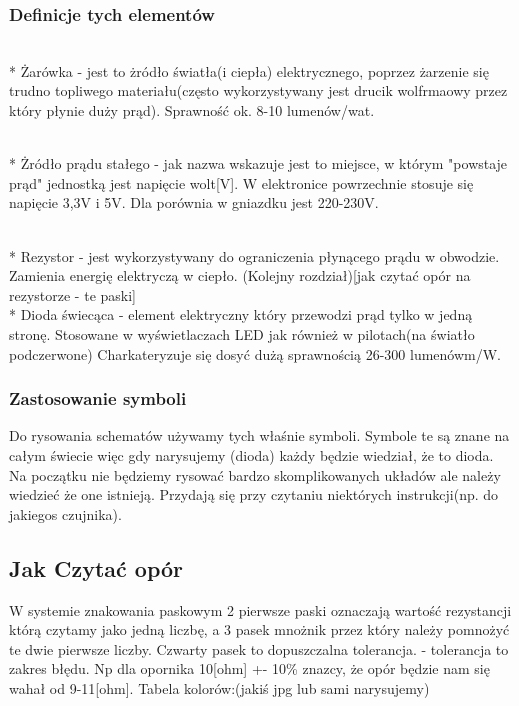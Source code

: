    \subsubsection{Definicje tych elementów}
\\* Żarówka - jest to żródło światła(i ciepła) elektrycznego, poprzez żarzenie się trudno topliwego materiału(często wykorzystywany jest drucik wolfrmaowy przez który płynie duży prąd). Sprawność ok.
8-10 lumenów/wat. 

\\* Żródło prądu stałego - jak nazwa wskazuje jest to miejsce, w którym "powstaje prąd" jednostką jest napięcie wolt[V]. W elektronice powrzechnie stosuje się napięcie 3,3V i 5V. Dla porównia w gniazdku jest 220-230V.

\\* Rezystor - jest wykorzystywany do ograniczenia płynącego prądu w obwodzie. Zamienia energię elektryczą w ciepło. (Kolejny rozdział)[jak czytać opór na rezystorze - te paski]
\\* Dioda świecąca - element elektryczny który przewodzi prąd tylko w jedną stronę. Stosowane w wyświetlaczach LED jak również w pilotach(na światło podczerwone) Charkateryzuje się dosyć dużą sprawnością 26-300 lumenówm/W. 

\subsubsection{Zastosowanie symboli}
    
Do rysowania schematów używamy tych właśnie symboli. Symbole te są znane na całym świecie więc gdy narysujemy (dioda) każdy będzie wiedział, że to dioda. Na początku nie będziemy rysować bardzo skomplikowanych układów ale należy wiedzieć że one istnieją. Przydają się przy czytaniu niektórych instrukcji(np. do jakiegos czujnika).

	\subsection{Jak Czytać opór}
	W systemie znakowania paskowym 2 pierwsze paski oznaczają wartość rezystancji którą czytamy jako jedną liczbę, a 3 pasek mnożnik przez który należy pomnożyć te dwie pierwsze liczby.
Czwarty pasek to dopuszczalna tolerancja. - tolerancja to zakres błędu. Np dla opornika 10[ohm] +- 10\% znazcy, że opór będzie nam się wahał od 9-11[ohm].
Tabela kolorów:(jakiś jpg lub sami narysujemy)

